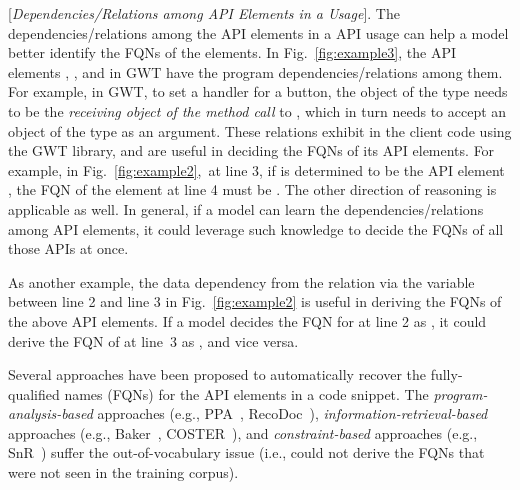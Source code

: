 \vspace{2pt}
 [{\em Dependencies/Relations among API
    Elements in a Usage}]. The dependencies/relations among the API
elements in a API usage can help a model better identify the FQNs of
the elements.  In Fig.~\ref{fig:example3}, the API elements
, , and  in GWT
have the program dependencies/relations among them. For example, in
GWT, to set a handler for a button, the object of the type
 needs to be the {\em receiving object of the method
  call} to , which in turn needs to accept an
object of the type  as an argument. These relations
exhibit in the client code using the GWT library, and are useful in
deciding the FQNs of its API elements. For example, in
Fig.~\ref{fig:example2},~at line 3, if  is
determined to be the API element
, the
FQN of the element at line 4 must be
.  The
other direction of reasoning is applicable as well. In general, if a
model can learn the dependencies/relations among API elements, it
could leverage such knowledge to decide the FQNs of all those APIs at once.


As another example, the data dependency from the 
relation via the variable  between line 2 and line 3 in
Fig.~\ref{fig:example2} is useful in deriving the FQNs of the
above API elements. If a model decides the FQN for  at
line 2 as , it
could derive the FQN of  at line~3 as
,
and vice versa.

\vspace{2pt}
 Several approaches have
been proposed to automatically recover the fully-qualified names
(FQNs) for the API elements in a code snippet. The {\em
  program-analysis-based} approaches (e.g.,
PPA~\cite{dagenais-oopsla08}, RecoDoc~\cite{dagenais-icse12}), {\em
  information-retrieval-based} approaches (e.g.,
Baker~\cite{liveapi14}, COSTER~\cite{coster-ase19}), and {\em
  constraint-based} approaches (e.g., SnR~\cite{snr-icse22}) suffer
the out-of-vocabulary issue (i.e., could not derive the FQNs that were
not seen in the training corpus).

